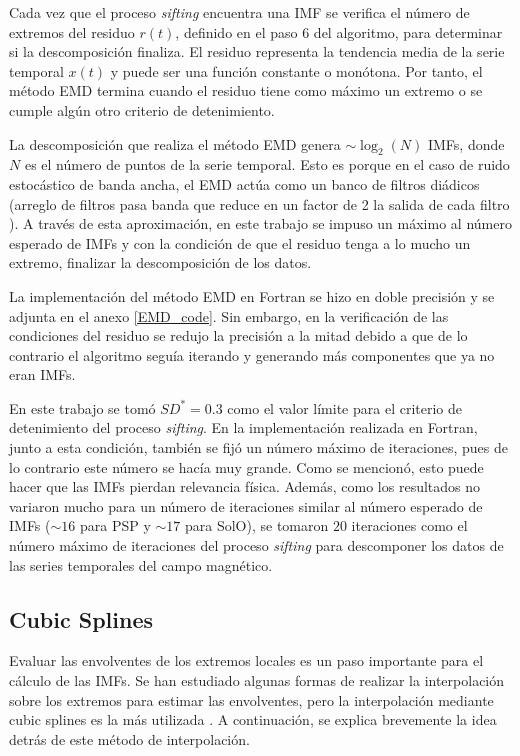 Cada vez que el proceso \textit{sifting} encuentra una IMF se verifica el número de extremos del residuo $r(t)$, definido en el paso 6 del algoritmo, para determinar si la descomposición finaliza. El residuo representa la tendencia media de la serie temporal $x(t)$ y puede ser una función constante o monótona. Por tanto, el método EMD termina cuando el residuo tiene como máximo un extremo o se cumple algún otro criterio de detenimiento.

La descomposición que realiza el método EMD genera $\sim \log_{2}(N)$ IMFs, donde $N$ es el número de puntos de la serie temporal. Esto es porque en el caso de ruido estocástico de banda ancha, el EMD actúa como un banco de filtros diádicos \cite{flandrin_empirical_2004} (arreglo de filtros pasa banda que reduce en un factor de 2 la salida de cada filtro \cite{ filter_banks}). A través de esta aproximación, en este trabajo se impuso un máximo al número esperado de IMFs y con la condición de que el residuo tenga a lo mucho un extremo, finalizar la descomposición de los datos.   

La implementación del método EMD en Fortran se hizo en doble precisión y se adjunta en el anexo \ref{EMD_code}. Sin embargo, en la verificación de las condiciones del residuo se redujo la precisión a la mitad debido a que de lo contrario el algoritmo seguía iterando y generando más componentes que ya no eran IMFs.

En este trabajo se tomó $SD^{*} = 0.3$ como el valor límite para el criterio de detenimiento del proceso \textit{sifting}. En la implementación realizada en Fortran, junto a esta condición, también se fijó un número máximo de iteraciones, pues de lo contrario este número se hacía muy grande. Como se mencionó, esto puede hacer que las IMFs pierdan relevancia física. Además, como los resultados no variaron mucho para un número de iteraciones similar al número esperado de IMFs ($\sim 16$ para PSP y $\sim 17$ para SolO), se tomaron $20$ iteraciones como el número máximo de iteraciones del proceso \textit{sifting} para descomponer los datos de las series temporales del campo magnético.

\subsection{Cubic Splines}

\noindent Evaluar las envolventes de los extremos locales es un paso importante para el cálculo de las IMFs. Se han estudiado algunas formas de realizar la interpolación sobre los extremos para estimar las envolventes, pero la interpolación mediante cubic splines es la más utilizada \cite{huang_empirical_1998, rilling_empirical_nodate}. A continuación, se explica brevemente la idea detrás de este método de interpolación.   

